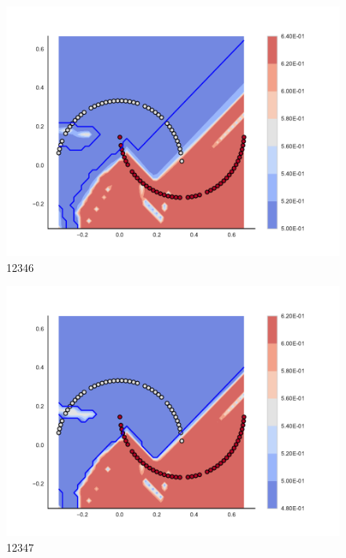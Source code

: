 \begin{subfigure}[b]{0.09\textwidth}
    \includegraphics[clip, trim=2.35cm 1.75cm 4.5cm 0cm,width=\textwidth]{img/convergence/12346.pdf}
    \caption{12346}
    \label{fig:convergence_12346}
\end{subfigure}
%
\begin{subfigure}[b]{0.09\textwidth}
    \includegraphics[clip, trim=2.35cm 1.75cm 4.5cm 0cm,width=\textwidth]{img/convergence/12347.pdf}
    \caption{12347}
    \label{fig:convergence_12347}
\end{subfigure}
%
